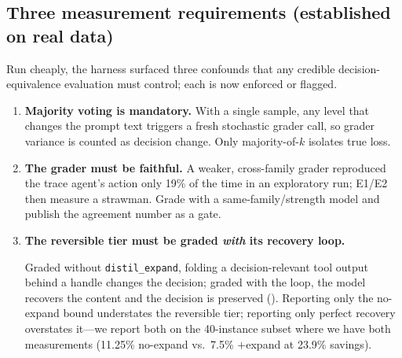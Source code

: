\documentclass[11pt]{article}
\begin{document}

\subsection{Three measurement requirements (established on real data)}
Run cheaply, the harness surfaced three confounds that any credible
decision-equivalence evaluation must control; each is now enforced or flagged.
\begin{enumerate}
  \item \textbf{Majority voting is mandatory.} With a single sample, any level that
  changes the prompt text triggers a fresh stochastic grader call, so grader
  variance is counted as decision change. Only majority-of-$k$ isolates true loss.
  \item \textbf{The grader must be faithful.} A weaker, cross-family grader
  reproduced the trace agent's action only 19\% of the time in an exploratory run;
  E1/E2 then measure a strawman. Grade with a same-family/strength model and publish
  the agreement number as a gate.
  \item \textbf{The reversible tier must be graded \emph{with} its recovery loop.}
  {\sloppy
  Graded without \texttt{distil\_expand}, folding a decision-relevant tool output
  behind a handle changes the decision; graded with the loop, the model recovers the
  content and the decision is preserved (). Reporting only the
  no-expand bound understates the reversible tier; reporting only perfect recovery
  overstates it---we report both on the 40-instance subset where we have both
  measurements (11.25\% no-expand vs.\ 7.5\% $+$expand at 23.9\% savings).\par}
\end{enumerate}
\end{document}

